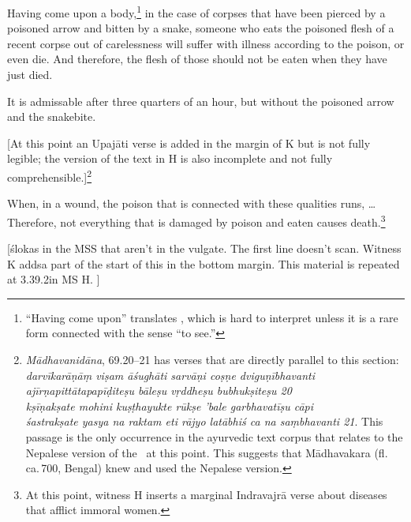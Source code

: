 \begin{translation}[resume]
\dag Having come upon a body,\footnote{“Having come upon” translates
    , which is hard to interpret unless it is a rare form
    connected with the sense “to see.”} in the case of corpses that have
    been pierced by a poisoned arrow and bitten by a snake, someone who
    eats the poisoned flesh of a recent corpse out of carelessness will
    suffer with illness according to the poison, or even die. And
    therefore, the flesh of those should not be eaten when they have just
    died.
  
It is admissable after three quarters of an hour, but without the
poisoned arrow and the snakebite.
  
\item[35.1]

[At this point an Upajāti verse is added in the margin of K but is not
fully legible; the version of the text in H is also incomplete and not
fully comprehensible.]\footnote{\emph{Mādhavanidāna}, 69.20--21
    \citep[480]{madhava1} has verses that are directly parallel to this
    section:\\ \emph{darvīkarāṇāṃ viṣam āśughāti sarvāṇi coṣṇe
    dviguṇībhavanti ajīrṇapittātapapīḍiteṣu bāleṣu vṛddheṣu bubhukṣiteṣu
    20\\ kṣīṇakṣate mohini kuṣṭhayukte rūkṣe ’bale garbhavatīṣu cāpi\\
    śastrakṣate yasya na raktam eti rājyo latābhiś ca na saṃbhavanti 21}.
    This passage is the only occurrence in the ayurvedic text corpus that
    relates to the Nepalese version of the \SS\ at this point. This
    suggests that Mādhavakara (fl.\,ca.\,700, Bengal) knew and used the
    Nepalese version.}
  

  \item[35.3]

\dag When, in a wound, the poison that is connected with these
qualities runs, \ldots Therefore, not everything that is damaged by
poison and eaten causes death.\footnote{At this point, witness H
    inserts a marginal Indravajrā verse about diseases that afflict
    immoral women.}
  
\item[35.1] 

  [ślokas in the MSS that aren't in the vulgate. The first line
doesn't scan. Witness K addsa part of the start of this in the
bottom margin. This material is repeated at 3.39.2in MS H. ]
  

  \item
  [35cd \& 36cd] 
  

\end{translation}
